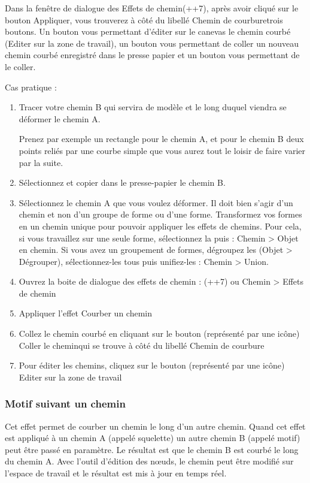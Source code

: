 \documentclass[a4paper,twoside]{article}
\begin{document}
Dans la fenêtre de dialogue des \og Effets de chemin\fg  (++7), après avoir cliqué sur le bouton \og Appliquer\fg , vous trouverez à côté du libellé \og Chemin de courbure\fg  trois boutons. Un bouton vous permettant d'éditer sur le canevas le chemin courbé (Editer sur la zone de travail), un bouton vous permettant de coller un nouveau chemin courbé enregistré dans le presse papier et un bouton vous permettant de le coller.

Cas pratique :
\begin{enumerate}
\item Tracer votre chemin B qui servira de modèle et le long duquel viendra se déformer le chemin A.
\begin{exemple}
Prenez par exemple un rectangle pour le chemin A, et pour le chemin B deux points reliés par une courbe simple que vous aurez tout le loisir de faire varier par la suite.
\end{exemple}
\item Sélectionnez et copier dans le presse-papier le chemin B.
\item Sélectionnez le chemin A que vous voulez déformer. Il doit bien s'agir d'un chemin et non d'un groupe de forme ou d'une forme. Transformez vos formes en un chemin unique pour pouvoir appliquer les \og effets de chemins\fg . Pour cela, si vous travaillez sur une seule forme, sélectionnez la puis : Chemin > Objet en chemin. Si vous avez un groupement de formes, dégroupez les (Objet > Dégrouper), sélectionnez-les tous puis unifiez-les : Chemin > Union.
\item Ouvrez la boite de dialogue des effets de chemin : (++7) ou Chemin > Effets de chemin
\item Appliquer l'effet \og Courber un chemin\fg
\item Collez le chemin courbé en cliquant sur le bouton (représenté par une icône) \og Coller le chemin\fg  qui se trouve à côté du libellé \og Chemin de courbure\fg
\item Pour éditer les chemins, cliquez sur le bouton (représenté par une icône) \og Editer sur la zone de travail\fg
\end{enumerate}



\subsubsection{Motif suivant un chemin}
Cet effet permet de courber un chemin le long d'un autre chemin. Quand cet effet est appliqué à un chemin A (appelé squelette) un autre chemin B (appelé motif) peut être passé en paramètre. Le résultat est que le chemin B est courbé le long du chemin A. Avec l'outil d'édition des n\oe uds, le chemin peut être modifié sur l'espace de travail et le résultat est mis à jour en temps réel.
\end{document}
